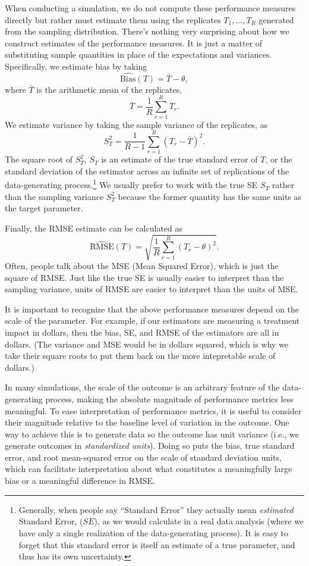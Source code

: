 \documentclass[
]{book}
\newcommand{\Bias}{\text{Bias}}
\newcommand{\RMSE}{\text{RMSE}}
\begin{document}
When conducting a simulation, we do not compute these performance measures directly but rather must estimate them using the replicates \(T_1,...,T_R\) generated from the sampling distribution.
There's nothing very surprising about how we construct estimates of the performance measures.
It is just a matter of substituting sample quantities in place of the expectations and variances.
Specifically, we estimate bias by taking
\[
\widehat{\Bias}(T) = \bar{T} - \theta, 
\label{eq:bias-estimator}
\]
where \(\bar{T}\) is the arithmetic mean of the replicates,
\[ 
\bar{T} = \frac{1}{R}\sum_{r=1}^R T_r.
\]
We estimate variance by taking the sample variance of the replicates, as
\[
S_T^2 = \frac{1}{R - 1}\sum_{r=1}^R \left(T_r - \bar{T}\right)^2. 
\label{eq:var-estimator}
\]
The square root of \(S^2_T\), \(S_T\) is an estimate of the true standard error of \(T\), or the standard deviation of the estimator across an infinite set of replications of the data-generating process.\footnote{Generally, when people say ``Standard Error'' they actually mean \emph{estimated} Standard Error, (\(\widehat{SE}\)), as we would calculate in a real data analysis (where we have only a single realization of the data-generating process). It is easy to forget that this standard error is itself an estimate of a true parameter, and thus has its own uncertainty.}
We usually prefer to work with the true SE \(S_T\) rather than the sampling variance \(S_T^2\) because the former quantity has the same units as the target parameter.

Finally, the RMSE estimate can be calculated as
\[ 
\widehat{\RMSE}(T) = \sqrt{\frac{1}{R} \sum_{r = 1}^R \left( T_r - \theta\right)^2 }.  
\label{eq:rmse-estimator}
\]
Often, people talk about the MSE (Mean Squared Error), which is just the square of RMSE.
Just like the true SE is usually easier to interpret than the sampling variance, units of RMSE are easier to interpret than the units of MSE.

It is important to recognize that the above performance measures depend on the scale of the parameter.
For example, if our estimators are measuring a treatment impact in dollars, then the bias, SE, and RMSE of the estimators are all in dollars.
(The variance and MSE would be in dollars squared, which is why we take their square roots to put them back on the more intepretable scale of dollars.)

In many simulations, the scale of the outcome is an arbitrary feature of the data-generating process, making the absolute magnitude of performance metrics less meaningful.
To ease interpretation of performance metrics, it is useful to consider their magnitude relative to the baseline level of variation in the outcome.
One way to achieve this is to generate data so the outcome has unit variance (i.e., we generate outcomes in \emph{standardized units}).
Doing so puts the bias, true standard error, and root mean-squared error on the scale of standard deviation units, which can facilitate interpretation about what constitutes a meaningfully large bias or a meaningful difference in RMSE.
\end{document}
